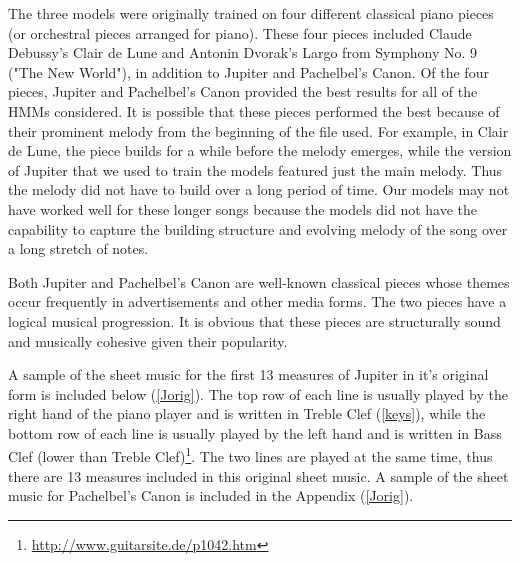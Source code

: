 \documentclass{article} %
\begin{document}
The three models were originally trained on four different classical piano pieces (or orchestral pieces arranged for piano).  These four pieces included Claude Debussy's Clair de Lune and Antonin Dvorak's Largo from Symphony No. 9 ("The New World"), in addition to Jupiter and Pachelbel's Canon.  Of the four pieces, Jupiter and Pachelbel's Canon provided the best results for all of the HMMs considered. It is possible that these pieces performed the best because of their prominent melody from the beginning of the file used. For example, in  Clair de Lune, the piece builds for a while before the melody emerges, while the version of Jupiter that we used to train the models featured just the main melody. Thus the melody did not have to build over a long period of time. Our models may not have worked well for these longer songs because the models did not have the capability to capture the building structure and evolving melody of the song over a long stretch of notes.  

Both Jupiter and Pachelbel's Canon are well-known classical pieces whose themes occur frequently in advertisements and other media forms. The two pieces have a logical musical progression. It is obvious that these pieces are structurally sound and musically cohesive given their popularity. 

 A sample of the sheet music for the first 13 measures of Jupiter in it's original form is included below (\autoref{Jorig}).  The top row of each line is usually played by the right hand of the piano player and is written in Treble Clef (\autoref{keys}), while the bottom row of each line is usually played by the left hand and is written in Bass Clef  (lower than Treble Clef)\footnote{\url{http://www.guitarsite.de/p1042.htm}}. The two lines are played at the same time, thus there are 13 measures included in this original sheet music.  A sample of the sheet music for Pachelbel's Canon is included in the Appendix (\autoref{Jorig}).
 

 
 
\end{document}
